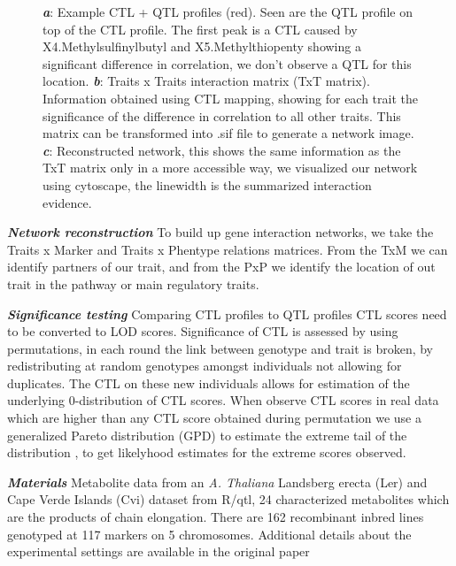 \documentclass{bioinfo}
\begin{document}
\begin{figure}[ht]
\begin{center}
{      \label{subfigc}
    }
  \end{center}
  \begin{minipage}{7in}
  \label{newplots}
  \vspace{-0.7cm}
  \caption[Plots]{
  {\emph {\bf a}}: Example CTL + QTL profiles (red). Seen are the QTL profile on top of the CTL profile. 
  The first peak is a CTL caused by X4.Methylsulfinylbutyl and X5.Methylthiopenty showing a significant 
  difference in correlation, we don't observe a QTL for this location. 
  {\emph {\bf b}}: Traits x Traits interaction matrix (TxT matrix). Information obtained using CTL mapping, 
  showing for each trait the significance of the difference in correlation to all other traits. This 
  matrix can be transformed into .sif file to generate a network image. 
  {\emph {\bf c}}:  Reconstructed network, this shows the same information as the TxT matrix only in a more accessible way, we visualized our 
  network using cytoscape, the linewidth is the summarized interaction evidence.
 }
\end{minipage}
\vspace{-0.5cm}
\end{figure}

  
\emph{ {\bf Network reconstruction}}
  To build up gene interaction networks, we take the Traits x Marker and Traits x Phentype 
  relations matrices.  From the TxM we can identify partners of our trait, and from the PxP we 
  identify the location of out trait in the pathway or main regulatory traits.

\emph{ {\bf Significance testing}}
  Comparing CTL profiles to QTL profiles CTL scores need to be converted to LOD scores. Significance 
  of CTL is assessed by using permutations, in each round the link between genotype and 
  trait is broken, by redistributing at random genotypes amongst individuals not 
  allowing for duplicates. The CTL on these new individuals allows for estimation of 
  the underlying 0-distribution of CTL scores. When observe CTL scores in 
  real data which are higher than any CTL score obtained during permutation we 
  use a generalized Pareto distribution (GPD) to estimate the extreme tail 
  of the distribution \cite{Knijnenburg:2009}, to get likelyhood estimates for the 
  extreme scores observed.

\emph{ {\bf Materials}}
  Metabolite data from an \emph{A. Thaliana} Landsberg erecta (Ler) and Cape Verde Islands (Cvi) 
  dataset from R/qtl, 24 characterized metabolites which are the products of chain elongation. 
  There are 162 recombinant inbred lines genotyped at 117 markers on 5 chromosomes. Additional 
  details about the experimental settings are available in the original paper \cite{Keurentjes:2006,AlonsoBlanco:1998}
\vspace{-0.6cm}
\end{document}
